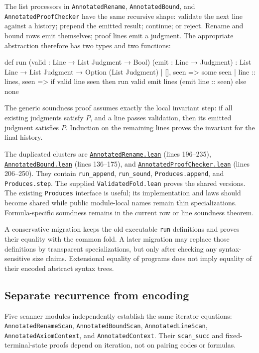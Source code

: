 \documentclass[11pt,letterpaper]{article}
\newcommand{\code}[1]{\nolinkurl{#1}}
\newcommand{\src}[2]{\href{https://github.com/VladimirReshetnikov/ProveIt/blob/60e9c5d620c6c387d932876cfa2d9376f64ea56c/Computability/DiophantineConsistency/Lean/DiophantineConsistency/#1.lean}{\nolinkurl{#1.lean}} (lines #2)}
\begin{document}
The list processors in \code{AnnotatedRename}, \code{AnnotatedBound},
and \code{AnnotatedProofChecker} have the same recursive shape: validate
the next line against a history; prepend the emitted result; continue;
or reject. Rename and bound rows emit themselves; proof lines emit a
judgment. The appropriate abstraction therefore has two types and two
functions:

\begin{Lean}
def run (valid : Line → List Judgment → Bool)
    (emit : Line → Judgment) :
    List Line → List Judgment → Option (List Judgment)
  | [], seen => some seen
  | line :: lines, seen =>
      if valid line seen then
        run valid emit lines (emit line :: seen)
      else none
\end{Lean}

The generic soundness proof assumes exactly the local invariant step:
if all existing judgments satisfy \(P\), and a line passes validation,
then its emitted judgment satisfies \(P\). Induction on the remaining
lines proves the invariant for the final history.

The duplicated clusters are \src{AnnotatedRename}{196--235},
\src{AnnotatedBound}{136--175}, and
\src{AnnotatedProofChecker}{206--250}. They contain \code{run_append},
\code{run_sound}, \code{Produces.append}, and \code{Produces.step}.
The supplied \code{ValidatedFold.lean} proves the shared versions.
The existing \code{Produces} interface is useful; its implementation and
laws should become shared while public module-local names remain thin
specializations. Formula-specific soundness remains in the current row
or line soundness theorem.

A conservative migration keeps the old executable \code{run} definitions
and proves their equality with the common fold. A later migration may
replace those definitions by transparent specializations, but only after
checking any syntax-sensitive size claims. Extensional equality of
programs does not imply equality of their encoded abstract syntax trees.

\subsection{Separate recurrence from encoding}

Five scanner modules independently establish the same iterator equations:
\code{AnnotatedRenameScan}, \code{AnnotatedBoundScan},
\code{AnnotatedLineScan}, \code{AnnotatedAxiomContext}, and
\code{AnnotatedContext}. Their \code{scan_succ} and fixed-terminal-state
proofs depend on iteration, not on pairing codes or formulas.
\end{document}
